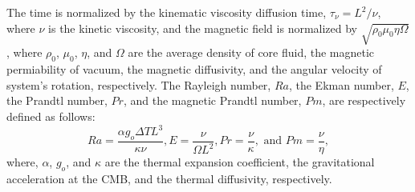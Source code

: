 The time is normalized by the kinematic viscosity diffusion time, $\tau_{\nu}  = L^{2} / \nu$, where $\nu$ is the kinetic viscosity, and the magnetic field is normalized by $\sqrt{\rho_{0} \mu_{0} \eta \Omega}$, where $\rho_{0}$, $\mu_{0}$, $\eta$, and $\Omega$ are the average density of core fluid, the magnetic permiability of vacuum, the magnetic diffusivity, and the angular velocity of system's rotation, respectively.
The Rayleigh number, $Ra$, the Ekman number, $E$, the Prandtl number, $Pr$, and the magnetic Prandtl number, $Pm$, are respectively defined as follows:
%
\begin{equation}
Ra = \displaystyle{ \frac{\alpha g_o \Delta T L^{3}}{ \kappa \nu} }, 
E  = \displaystyle{ \frac{\nu}{\Omega L^{2}} },
Pr = \displaystyle{ \frac{\nu}{\kappa} }, 
\mbox{ and }
Pm = \displaystyle{ \frac{\nu}{\eta} },
\label{eq:dimensionless}
\end{equation}
%
where, $\alpha$, $g_o$, and $\kappa$ are the thermal expansion coefficient, the gravitational acceleration at the CMB, and the thermal diffusivity, respectively.

